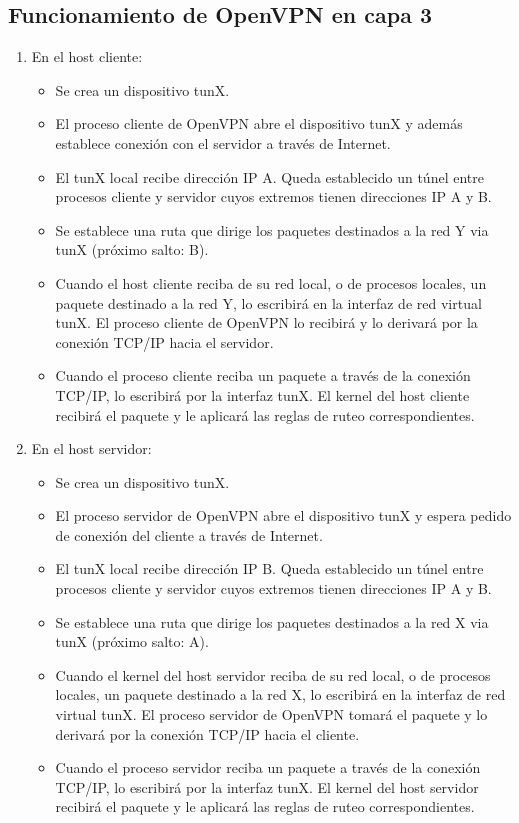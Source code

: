 \subsection{Funcionamiento de OpenVPN en capa 3}

\begin{enumerate}
	\item En el host cliente:
	\begin{itemize}
		\item Se crea un dispositivo tunX.
		\item El proceso cliente de OpenVPN abre el dispositivo tunX y además establece conexión con el servidor a través de Internet.
		\item El tunX local recibe dirección IP A. Queda establecido un túnel entre procesos cliente y servidor cuyos extremos tienen direcciones IP A y B.
		\item Se establece una ruta que dirige los paquetes destinados a la red Y via tunX (próximo salto: B).
		\item Cuando el host cliente reciba de su red local, o de procesos locales, un paquete destinado a la red Y, lo escribirá en la interfaz de red virtual tunX. El proceso cliente de OpenVPN lo recibirá y lo derivará por la conexión TCP/IP hacia el servidor.
		\item Cuando el proceso cliente reciba un paquete a través de la conexión TCP/IP, lo escribirá por la interfaz tunX. El kernel del host cliente recibirá el paquete y le aplicará las reglas de ruteo correspondientes. 
	\end{itemize}
	\item En el host servidor:
	\begin{itemize}
		\item Se crea un dispositivo tunX.
		\item El proceso servidor de OpenVPN abre el dispositivo tunX y espera pedido de conexión del cliente a través de Internet.
		\item El tunX local recibe dirección IP B. Queda establecido un túnel entre procesos cliente y servidor cuyos extremos tienen direcciones IP A y B. 
		\item Se establece una ruta que dirige los paquetes destinados a la red X via tunX (próximo salto: A).
		\item Cuando el kernel del host servidor reciba de su red local, o de procesos locales, un paquete destinado a la red X, lo escribirá en la interfaz de red virtual tunX. El proceso servidor de OpenVPN tomará el paquete y lo derivará por la conexión TCP/IP hacia el cliente.
		\item Cuando el proceso servidor reciba un paquete a través de la conexión TCP/IP, lo escribirá por la interfaz tunX. El kernel del host servidor recibirá el paquete y le aplicará las reglas de ruteo correspondientes. 
	\end{itemize}
\end{enumerate}

